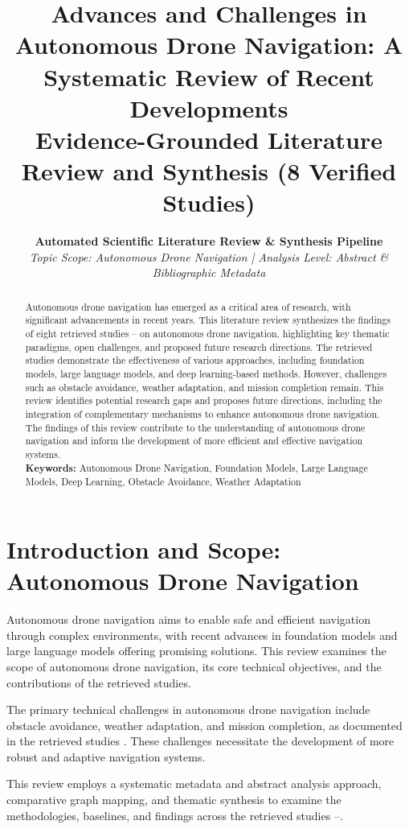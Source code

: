 \documentclass[10pt,twocolumn,letterpaper]{article}
\title{\LARGE \textbf{Advances and Challenges in Autonomous Drone Navigation: A Systematic Review of Recent Developments}\\[4pt]
\large Evidence-Grounded Literature Review and Synthesis (8 Verified Studies)}
\author{\textbf{Automated Scientific Literature Review \& Synthesis Pipeline}\\
\small \textit{Topic Scope: Autonomous Drone Navigation | Analysis Level: Abstract \& Bibliographic Metadata}}
\date{}
\begin{document}
\maketitle

\begin{abstract}
\noindent Autonomous drone navigation has emerged as a critical area of research, with significant advancements in recent years. This literature review synthesizes the findings of eight retrieved studies \cite{ref1}–\cite{ref8} on autonomous drone navigation, highlighting key thematic paradigms, open challenges, and proposed future research directions. The retrieved studies demonstrate the effectiveness of various approaches, including foundation models, large language models, and deep learning-based methods. However, challenges such as obstacle avoidance, weather adaptation, and mission completion remain. This review identifies potential research gaps and proposes future directions, including the integration of complementary mechanisms to enhance autonomous drone navigation. The findings of this review contribute to the understanding of autonomous drone navigation and inform the development of more efficient and effective navigation systems.
\vspace{4pt}\\
\noindent \textbf{Keywords:} Autonomous Drone Navigation, Foundation Models, Large Language Models, Deep Learning, Obstacle Avoidance, Weather Adaptation
\end{abstract}

\section{Introduction and Scope: Autonomous Drone Navigation}
Autonomous drone navigation aims to enable safe and efficient navigation through complex environments, with recent advances in foundation models and large language models \cite{ref1,ref2} offering promising solutions. This review examines the scope of autonomous drone navigation, its core technical objectives, and the contributions of the retrieved studies.

The primary technical challenges in autonomous drone navigation include obstacle avoidance, weather adaptation, and mission completion, as documented in the retrieved studies \cite{ref3,ref4,ref5}. These challenges necessitate the development of more robust and adaptive navigation systems.

This review employs a systematic metadata and abstract analysis approach, comparative graph mapping, and thematic synthesis to examine the methodologies, baselines, and findings across the retrieved studies \cite{ref1}–\cite{ref8}.
\end{document}
